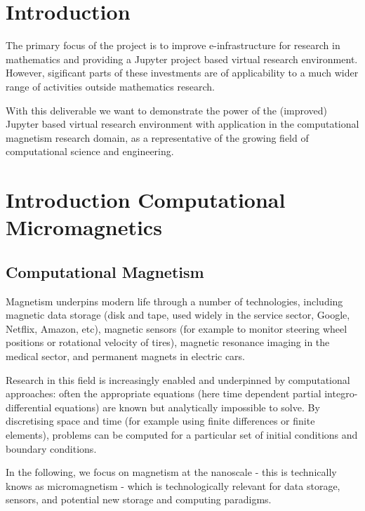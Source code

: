 \documentclass{deliverablereport}
\author{Marijan Beg and Hans Fangohr}
\begin{document}
\maketitle
\githubissuedescription
\newpage
\tableofcontents
\newpage

\section{Introduction}
The primary focus of the \ODK project is to improve
e-infrastructure for research in mathematics and providing a Jupyter
project based virtual research environment. However, sigificant parts
of these investments are of applicability to a much wider range of
activities outside mathematics research.

With this deliverable we want to demonstrate the power of the
(improved) Jupyter based virtual research environment with application
in the computational magnetism research domain, as a representative of
the growing field of computational science and engineering.

\section{Introduction Computational Micromagnetics}
\subsection{Computational Magnetism}

Magnetism underpins modern life through a number of technologies,
including magnetic data storage (disk and tape, used widely in the
service sector, Google, Netflix, Amazon, etc), magnetic sensors (for
example to monitor steering wheel positions or rotational velocity of
tires), magnetic resonance imaging in the medical sector, and
permanent magnets in electric cars.

Research in this field is increasingly enabled and underpinned by
computational approaches: often the appropriate equations (here time
dependent partial integro-differential equations) are known but
analytically impossible to solve. By discretising space and time (for
example using finite differences or finite elements), problems can be
computed for a particular set of initial conditions and boundary
conditions.

In the following, we focus on magnetism at the nanoscale -
this is technically knows as micromagnetism - which is technologically
relevant for data storage, sensors, and potential new storage and
computing paradigms.
\end{document}
